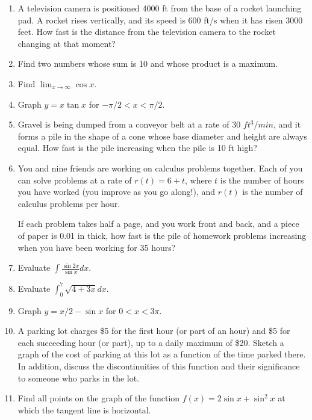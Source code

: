 \documentclass[12pt]{article}
\begin{document}
\begin{enumerate}[(1)]
\item
A television camera is positioned 4000 ft from the base of a rocket launching pad.
A rocket rises vertically, and its speed is 600 ft/s when it has risen 3000 feet.
How fast is the distance from the television camera to the rocket changing at that moment?

\item
Find two numbers whose sum is 10 and whose product is a maximum.

\item
Find $\lim_{x \rightarrow \infty} \cos x$.

\item
Graph $y = x \tan x$ for $ - \pi/2 < x< \pi/2$.

\item
Gravel is being dumped from a conveyor belt at a rate of 30 $ft^3/min$, and it forms
a pile in the shape of a cone whose base diameter and height are always equal. How fast is the pile
increasing when the pile is 10 ft high?

\item
You and nine friends are working on calculus problems together. Each of you can solve
problems at a rate of $r(t) = 6 + t$, where $t$ is the number of hours you have worked
(you improve as you go along!), and $r(t)$ is the number of calculus problems per hour.

If each problem takes half a page, and you work front and back, and a piece of paper
is 0.01 in thick, how fast is the pile of homework problems increasing when you have
been working for 35 hours?

\item
Evaluate $\int \frac{\sin 2x}{\sin x} dx$.

\item
Evaluate $\int_0^7 \sqrt{4 + 3x} dx$.

\item
Graph $y = x/2 - \sin x$ for $0 < x < 3 \pi$.

\item
A parking lot charges \$5 for the first hour (or part of an hour) and \$5 for
each succeeding hour (or part), up to a daily maximum of \$20. Sketch a graph
of the cost of parking at this lot as a function of the time parked there.
In addition, discuss the discontinuities of this function and their significance
to someone who parks in the lot.

\item
Find all points on the graph of the function $f(x) = 2 \sin x + \sin^2 x$ at which
the tangent line is horizontal.


\end{enumerate}
\end{document}
